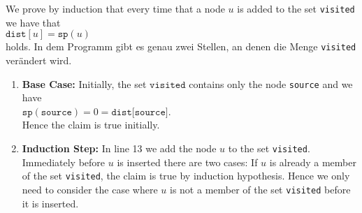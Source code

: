 \proof 
We prove by induction that every time that a node  $u$ is added to the set
\texttt{visited} we have that
\\[0.2cm]
\hspace*{1.3cm}
$\texttt{dist}[u] = \texttt{sp}(u)$ 
\\[0.2cm]
holds.
In dem Programm gibt es genau zwei Stellen, an denen die Menge \texttt{visited} ver\"andert wird.
\begin{enumerate}
\item \textbf{Base Case:}  
      Initially, the set $\texttt{visited}$ contains only the node \texttt{source} and we have
      \\[0.2cm]
      \hspace*{1.3cm}
      $\texttt{sp}(\texttt{source}) = 0 = \texttt{dist[source]}$.
      \\[0.2cm]
      Hence the claim is true initially.
\item \textbf{Induction Step:}
      In line 13 we add the node $u$ to the set \texttt{visited}.  Immediately before $u$ is
      inserted there are two cases: If $u$ is already a member of the set \texttt{visited}, the
      claim is true by induction hypothesis.  Hence we only need to consider the case where
      $u$ is not a member of the set \texttt{visited} before it is inserted.


\end{enumerate}
